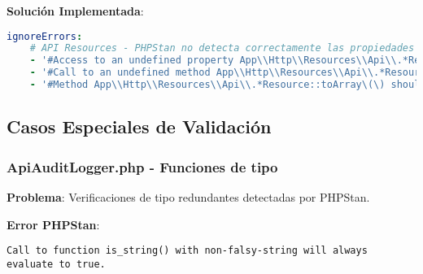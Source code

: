 \documentclass[12pt,a4paper]{article}
\begin{document}
\textbf{Solución Implementada}:
\begin{lstlisting}[language=yaml, caption=Configuración comprehensiva para Resources]
ignoreErrors:
    # API Resources - PHPStan no detecta correctamente las propiedades del modelo
    - '#Access to an undefined property App\\Http\\Resources\\Api\\.*Resource::\$.*#'
    - '#Call to an undefined method App\\Http\\Resources\\Api\\.*Resource::.*\(\)#'
    - '#Method App\\Http\\Resources\\Api\\.*Resource::toArray\(\) should return array<string, mixed> but returns array<int\|string, mixed>#'
\end{lstlisting}

\subsection{Casos Especiales de Validación}

\subsubsection{ApiAuditLogger.php - Funciones de tipo}

\textbf{Problema}: Verificaciones de tipo redundantes detectadas por PHPStan.

\textbf{Error PHPStan}:
\begin{lstlisting}[caption=Error en ApiAuditLogger.php]
Call to function is_string() with non-falsy-string will always evaluate to true.
\end{lstlisting}
\end{document}
